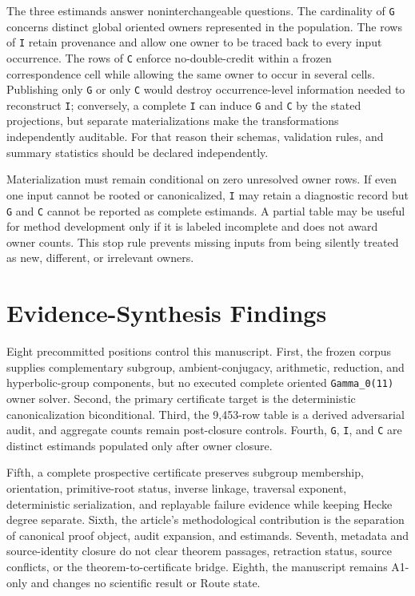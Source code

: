 \documentclass[11pt]{article}
\begin{document}
The three estimands answer noninterchangeable questions. The cardinality
of \texttt{G} concerns distinct global oriented owners represented in
the population. The rows of \texttt{I} retain provenance and allow one
owner to be traced back to every input occurrence. The rows of
\texttt{C} enforce no-double-credit within a frozen correspondence cell
while allowing the same owner to occur in several cells. Publishing only
\texttt{G} or only \texttt{C} would destroy occurrence-level information
needed to reconstruct \texttt{I}; conversely, a complete \texttt{I} can
induce \texttt{G} and \texttt{C} by the stated projections, but separate
materializations make the transformations independently auditable. For
that reason their schemas, validation rules, and summary statistics
should be declared independently.

Materialization must remain conditional on zero unresolved owner rows.
If even one input cannot be rooted or canonicalized, \texttt{I} may
retain a diagnostic record but \texttt{G} and \texttt{C} cannot be
reported as complete estimands. A partial table may be useful for method
development only if it is labeled incomplete and does not award owner
counts. This stop rule prevents missing inputs from being silently
treated as new, different, or irrelevant owners.

\hypertarget{5-evidence-synthesis-findings}{%
\section{Evidence-Synthesis
Findings}\label{5-evidence-synthesis-findings}}

Eight precommitted positions control this manuscript. First, the frozen
corpus supplies complementary subgroup, ambient-conjugacy, arithmetic,
reduction, and hyperbolic-group components, but no executed complete
oriented \texttt{Gamma\_0(11)} owner solver. Second, the primary
certificate target is the deterministic canonicalization biconditional.
Third, the 9,453-row table is a derived adversarial audit, and aggregate
counts remain post-closure controls. Fourth, \texttt{G}, \texttt{I}, and
\texttt{C} are distinct estimands populated only after owner closure.

Fifth, a complete prospective certificate preserves subgroup membership,
orientation, primitive-root status, inverse linkage, traversal exponent,
deterministic serialization, and replayable failure evidence while
keeping Hecke degree separate. Sixth, the article's methodological
contribution is the separation of canonical proof object, audit
expansion, and estimands. Seventh, metadata and source-identity closure
do not clear theorem passages, retraction status, source conflicts, or
the theorem-to-certificate bridge. Eighth, the manuscript remains A1-only
and changes no scientific result or Route state.
\end{document}
